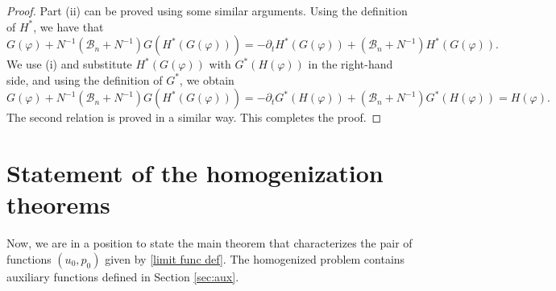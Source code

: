 \documentclass[reqno]{amsart}
\begin{document}
\begin{proof}
Part (ii) can be proved using some similar arguments. Using the
definition of $H^{\ast }$, we have that
\[
G(\varphi )+N^{-1}(\mathcal{B}_n+N^{-1})G(H^{\ast }(G(\varphi
)))=-\partial _{t}H^{\ast }(G(\varphi ))+(\mathcal{B}_n+N^{-1})H^{\ast
}(G(\varphi )).
\]%
We use (i) and substitute $H^{\ast }(G(\varphi ))$ with
$G^{\ast}(H(\varphi ))$ in the right-hand side, and using the definition of
$G^{\ast}$, we obtain
\[
G(\varphi )+N^{-1}(\mathcal{B}_n+N^{-1})G(H^{\ast }(G(\varphi
)))=-\partial _{t}G^{\ast }(H(\varphi ))+(\mathcal{B}_n+N^{-1})G^{\ast
}(H(\varphi ))=H(\varphi ).
\]%
The second relation is proved in a similar way. This completes the proof.
\end{proof}

\section{Statement of the homogenization theorems}

Now, we are in a position to state the main theorem that characterizes the
pair of functions $(u_0, p_0)$ given by \eqref{limit func def}. 
The homogenized problem contains auxiliary functions defined in Section \ref{sec:aux}.
\end{document}
